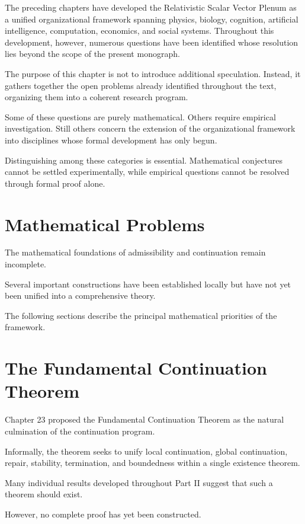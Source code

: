 \documentclass[11pt,oneside]{book}
\numberwithin{equation}{chapter}
\theoremstyle{definition}
\theoremstyle{plain}
\begin{document}
The preceding chapters have developed the Relativistic Scalar Vector Plenum
as a unified organizational framework spanning physics, biology, cognition,
artificial intelligence, computation, economics, and social systems.
Throughout this development, however, numerous questions have been
identified whose resolution lies beyond the scope of the present
monograph.

The purpose of this chapter is not to introduce additional speculation.
Instead, it gathers together the open problems already identified
throughout the text, organizing them into a coherent research program.

Some of these questions are purely mathematical. Others require empirical
investigation. Still others concern the extension of the organizational
framework into disciplines whose formal development has only begun.

Distinguishing among these categories is essential. Mathematical
conjectures cannot be settled experimentally, while empirical questions
cannot be resolved through formal proof alone.

\section{Mathematical Problems}

The mathematical foundations of admissibility and continuation remain
incomplete.

Several important constructions have been established locally but have not
yet been unified into a comprehensive theory.

The following sections describe the principal mathematical priorities of
the framework.

\section{The Fundamental Continuation Theorem}

Chapter 23 proposed the Fundamental Continuation Theorem as the natural
culmination of the continuation program.

Informally, the theorem seeks to unify local continuation, global
continuation, repair, stability, termination, and boundedness within a
single existence theorem.

Many individual results developed throughout Part II suggest that such a
theorem should exist.

However, no complete proof has yet been constructed.
\end{document}
